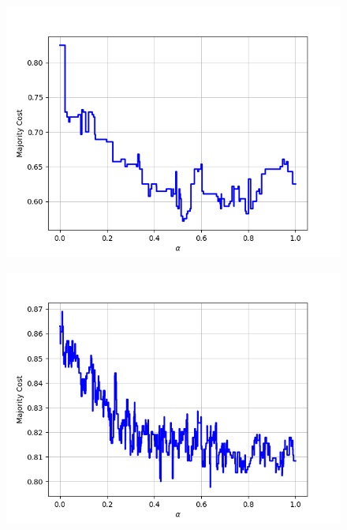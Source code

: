 \begin{figure}[h]
\begin{minipage}{.19\textwidth}
  {\includegraphics[width=\linewidth]{plots/omniglot-intra-ac/N_Ko}}
\end{minipage}
\begin{minipage}{.19\textwidth}
  \centering
  {\includegraphics[width=\linewidth]{plots/omniglot-intra-ac/Ojibwe_(Canadian_Aboriginal_Syllabics)}}
\end{minipage}
\begin{minipage}{.19\textwidth}
  \centering

\end{minipage}
\end{figure}
